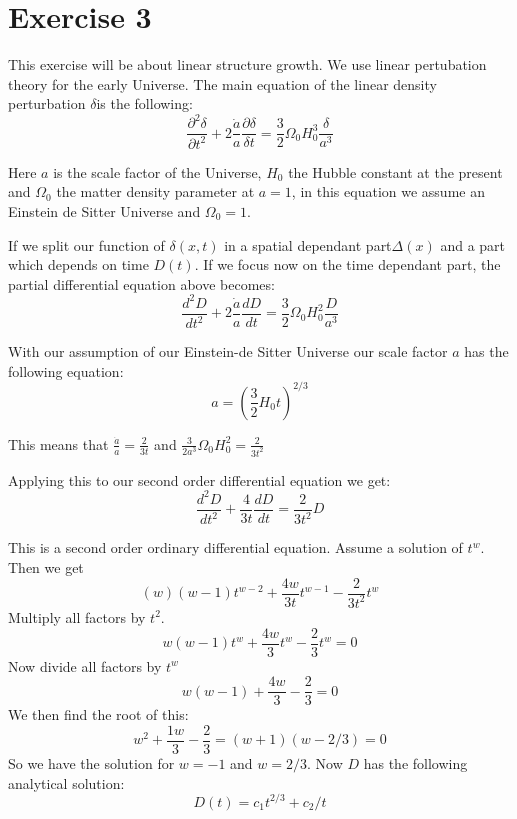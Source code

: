 \section{Exercise 3}
This exercise will be about linear structure growth. We use linear pertubation theory for the early Universe. The main equation of the linear density perturbation $\delta $is the following:
\begin{equation}
\frac{\partial^2\delta}{\partial t^2}+2\frac{\dot{a}}{a}\frac{\partial\delta}{\delta t}=\frac{3}{2}\Omega_0H_0^3\frac{\delta}{a^3}
\end{equation}

Here $a$ is the scale factor of the Universe, $H_0$ the Hubble constant at the present and $\Omega_0$ the matter density parameter at $a=1$, in this equation we assume an Einstein de Sitter Universe and $\Omega_0=1$.

If we split our function of $\delta(x,t)$ in a spatial dependant part$\Delta(x)$ and a part which depends on time $D(t)$. If we focus now on the time dependant part, the partial differential equation above becomes:
\begin{equation}
\frac{d^2 D}{dt^2}+2\frac{\dot{a}}{a}\frac{dD}{d t}=\frac{3}{2}\Omega_0H_0^2\frac{D}{a^3}
\end{equation}

With our assumption of our Einstein-de Sitter Universe our scale factor $a$ has the following equation:
\begin{equation}
a=\left(\frac{3}{2}H_0t\right)^{2/3}
\end{equation}

This means that $\frac{\dot{a}}{a}=\frac{2}{3t}$ and $\frac{3}{2a^3}\Omega_0H_0^2=\frac{2}{3t^2}$

Applying this to our second order differential equation we get:
\begin{equation}
\frac{d^2 D}{dt^2}+\frac{4}{3t}\frac{dD}{d t}=\frac{2}{3t^2} D
\end{equation}

This is a second order ordinary differential equation.
Assume a solution of $t^{w}$. Then we get
\begin{equation}
    (w)(w-1)t^{w-2}+\frac{4w}{3t}t^{w-1}-\frac{2}{3t^{2}}t^{w}
\end{equation}
Multiply all factors by $t^2$.
\begin{equation}
    w(w-1)t^{w}+\frac{4w}{3}t^{w}-\frac{2}{3}t^{w}=0
\end{equation}
Now divide all factors by $t^{w}$
\begin{equation}
    w(w-1)+\frac{4w}{3}-\frac{2}{3}=0
\end{equation}
We then find the root of this:
\begin{equation}
    w^2+\frac{1w}{3}-\frac{2}{3}=(w+1)(w-2/3)=0
\end{equation}
So we have the solution for $w=-1$ and $w=2/3$.
Now $D$ has the following analytical solution:
\begin{equation}
D(t)=c_1t^{2/3}+c_2/t
\end{equation}

